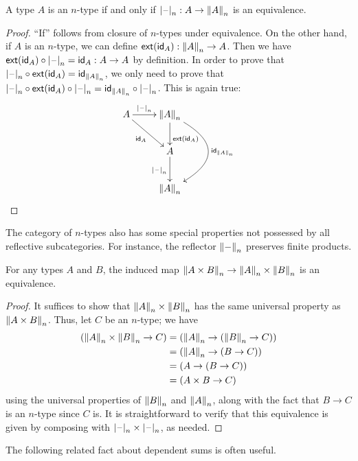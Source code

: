\begin{cor}
  A type $A$ is an $n$-type if and only if $\tprojf n : A \to \trunc n A$ is an equivalence.
\end{cor}
\begin{proof}
  ``If'' follows from closure of $n$-types under equivalence.
  On the other hand, if $A$ is an $n$-type, we can define $\ext(\idfunc[A]):\trunc n A\to{}A$.
  Then we have $\ext(\idfunc[A])\circ\tprojf n=\idfunc[A]:A\to{}A$ by
  definition.  In order to prove that
  $\tprojf n\circ\ext(\idfunc[A])=\idfunc[\trunc nA]$, we only need to prove
  that $\tprojf n\circ\ext(\idfunc[A])\circ\tprojf n=
  \idfunc[\trunc nA]\circ\tprojf n$.
  This is again true:
  \[\raisebox{\depth-\height+1em}{\xymatrix{
    A \ar^-{\tprojf n}[r] \ar_{\idfunc[A]}[rd] &
    \trunc nA \ar^>>>{\ext(\idfunc[A])}[d] \ar@/^40pt/^{\idfunc[\trunc nA]}[dd] \\
    & A \ar_{\tprojf n}[d] \\
    & \trunc nA}}
  \qedhere\]
\end{proof}

The category of $n$-types also has some special properties not possessed by all reflective subcategories.
For instance, the reflector $\trunc n-$ preserves finite products.

\begin{thm}\label{cor:trunc-prod}
  For any types $A$ and $B$, the induced map $\trunc n{A\times B} \to \trunc nA \times \trunc nB$ is an equivalence.
\end{thm}
\begin{proof}
  It suffices to show that $\trunc nA \times \trunc nB$ has the same universal property as $\trunc n{A\times B}$.
  Thus, let $C$ be an $n$-type; we have
  \begin{align*}
    (\trunc nA \times \trunc nB \to C)
    &= (\trunc nA \to (\trunc nB \to C))\\
    &= (\trunc nA \to (B \to C))\\
    &= (A \to (B \to C))\\
    &= (A \times B \to C)
  \end{align*}
  using the universal properties of $\trunc nB$ and $\trunc nA$, along with the fact that $B\to C$ is an $n$-type since $C$ is.
  It is straightforward to verify that this equivalence is given by composing with $\tprojf n \times \tprojf n$, as needed.
\end{proof}

The following related fact about dependent sums is often useful.

